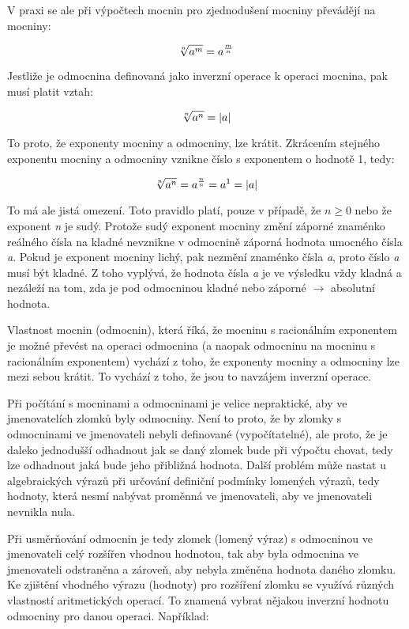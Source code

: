 V praxi se ale při výpočtech mocnin pro zjednodušení mocniny převádějí na mocniny:

$$ \root n\of{a^m} = a^{m\over n}  $$

Jestliže je odmocnina definovaná jako inverzní operace k operaci mocnina, pak musí platit vztah:

$$ \root n\of{a^n} = |a| $$

To proto, že exponenty mocniny a odmocniny, lze krátit. Zkrácením stejného exponentu mocniny a odmocniny vznikne číslo s exponentem o hodnotě 1, tedy:

$$\root n\of{a^n} = a^{n\over n} = a^1 = |a|$$

To má ale jistá omezení. Toto pravidlo platí, pouze v případě, že $n\geq 0$ nebo že exponent {\it n} je sudý. Protože sudý exponent mocniny změní záporné znaménko reálného čísla na kladné nevznikne v odmocnině záporná hodnota umocného čísla {\it a}. Pokud je exponent mocniny lichý, pak nezmění znaménko čísla {\it a}, proto číslo {\it a} musí být kladné. Z toho vyplývá, že hodnota čísla {\it a} je ve výsledku vždy kladná a nezáleží na tom, zda je pod odmocninou kladné nebo záporné $\rightarrow$ absolutní hodnota. 


Vlastnost mocnin (odmocnin), která říká, že mocninu s racionálním exponentem je možné převést na operaci odmocnina (a naopak odmocninu na mocninu s racionálním exponentem) vychází z toho, že exponenty mocniny a odmocniny lze mezi sebou krátit.	 To vychází z toho, že jsou to navzájem inverzní operace.


Při počítání s mocninami a odmocninami je velice nepraktické, aby ve jmenovatelích zlomků byly odmocniny. Není to proto, že by zlomky s odmocninami ve jmenovateli nebyli definované (vypočítatelné), ale proto, že je daleko jednodušší odhadnout jak se daný zlomek bude při výpočtu chovat, tedy lze odhadnout jaká bude jeho přibližná hodnota. Další problém může nastat u algebraických výrazů při určování definiční podmínky lomených výrazů, tedy hodnoty, která nesmí nabývat proměnná ve jmenovateli, aby ve jmenovateli nevnikla nula.

Při usměrňování odmocnin je tedy zlomek (lomený výraz) s odmocninou ve jmenovateli celý rozšířen vhodnou hodnotou, tak aby byla odmocnina ve jmenovateli odstraněna a zároveň, aby nebyla změněna hodnota daného zlomku. Ke zjištění vhodného výrazu (hodnoty) pro rozšíření zlomku se využívá různých vlastností aritmetických operací. To znamená vybrat nějakou inverzní hodnotu odmocniny pro danou operaci. Například:

